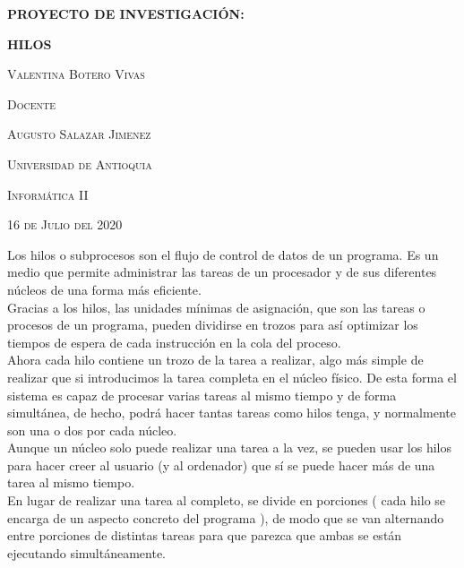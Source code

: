 \documentclass{report}   %
\begin{document}
\begin{titlepage}    %
	\centering
	{\huge\bfseries PROYECTO DE INVESTIGACIÓN: \par}
	\vspace{1cm}
	{\huge\bfseries HILOS \par}
    \vspace{3cm}
    {\scshape\large Valentina Botero Vivas \par}
    \vspace{3cm}
      {\scshape\large Docente  \par}
	\vspace{0.5cm}
    {\scshape\large Augusto Salazar Jimenez  \par}
	\vspace{3cm}
	 {\scshape\large Universidad de Antioquia \par}
	\vspace{1cm}
    {\scshape\large Informática II  \par}
	\vspace{1cm}
	{\scshape\large 16 de Julio del 2020 \par}
\end{titlepage}
Los hilos o subprocesos son  el flujo de control de datos de un programa. Es un medio que permite administrar las tareas de un procesador y de sus diferentes núcleos de una forma más eficiente.\\ Gracias a los hilos, las unidades mínimas de asignación, que son las tareas o procesos de un programa, pueden dividirse en trozos para así optimizar los tiempos de espera de cada instrucción en la cola del proceso.\\

Ahora cada hilo contiene un trozo de la tarea a realizar, algo más simple de realizar que si introducimos la tarea completa en el núcleo físico. De esta forma el sistema es capaz de procesar varias tareas al mismo tiempo y de forma simultánea, de hecho, podrá hacer tantas tareas como hilos tenga, y normalmente son una o dos por cada núcleo.\\
Aunque un núcleo solo puede realizar una tarea a la vez, se pueden usar los hilos para hacer creer al usuario (y al ordenador) que sí se puede hacer más de una tarea al mismo tiempo.\\
En lugar de realizar una tarea al completo, se divide en porciones ( cada hilo se encarga de un aspecto concreto del programa ), de modo que se van alternando entre porciones de distintas tareas para que parezca que ambas se están ejecutando simultáneamente.
\end{document}
